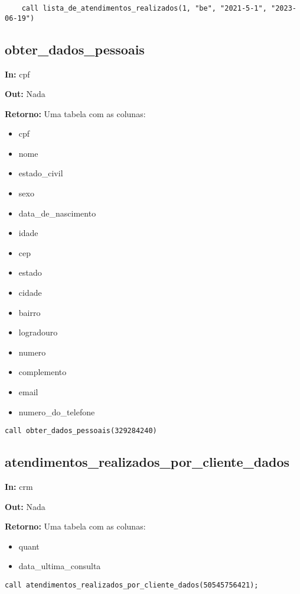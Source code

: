 \begin{verbatim}
	call lista_de_atendimentos_realizados(1, "be", "2021-5-1", "2023-06-19")
\end{verbatim}

\subsection{obter\_dados\_pessoais}

\textbf{In:} cpf

\textbf{Out:} Nada

\textbf{Retorno:} Uma tabela com as colunas:

\begin{itemize}
	\item cpf
	\item nome
	\item estado\_civil
	\item sexo
	\item data\_de\_nascimento
	\item idade
	\item cep
	\item estado
	\item cidade
	\item bairro
	\item logradouro
	\item numero
	\item complemento
	\item email
	\item numero\_do\_telefone
\end{itemize}

\begin{verbatim}
call obter_dados_pessoais(329284240)
\end{verbatim}


\subsection{atendimentos\_realizados\_por\_cliente\_dados}

\textbf{In:} crm

\textbf{Out:} Nada

\textbf{Retorno:} Uma tabela com as colunas:

\begin{itemize}
	\item quant
	\item data\_ultima\_consulta
\end{itemize}

\begin{verbatim}
call atendimentos_realizados_por_cliente_dados(50545756421);
\end{verbatim}

